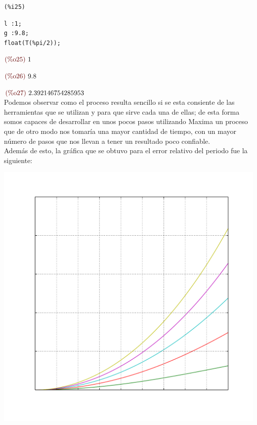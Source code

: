 \documentclass[12pt]{article}
\begin{document}
\noindent
\begin{minipage}[t]{8ex}{\color{red}\bf
\begin{verbatim}
(%i25) 
\end{verbatim}}
\end{minipage}
\begin{minipage}[t]{\textwidth}{\color{blue}
\begin{verbatim}
l :1;
g :9.8;
float(T(%pi/2));
\end{verbatim}}
\end{minipage}
\begin{math}\displaystyle
\parbox{8ex}{\color{labelcolor}(\%o25) }
1
\end{math}

\begin{math}\displaystyle
\parbox{8ex}{\color{labelcolor}(\%o26) }
9.8
\end{math}

\begin{math}\displaystyle
\parbox{8ex}{\color{labelcolor}(\%o27) }
2.392146754285953
\end{math}\\

Podemos observar como el proceso resulta sencillo si se esta consiente de las herramientas que se utilizan y para que sirve cada una de ellas; de esta forma somos capaces de desarrollar en unos pocos pasos utilizando Maxima un proceso que de otro modo nos tomaría una mayor cantidad de tiempo, con un mayor número de pasos que nos llevan a tener un resultado poco confiable.\\

Además de esto, la gráfica que se obtuvo para el error relativo del periodo fue la siguiente:
\begin{center}
\includegraphics[scale=0.5]{Act9.pdf}
\end{center}
\end{document}
